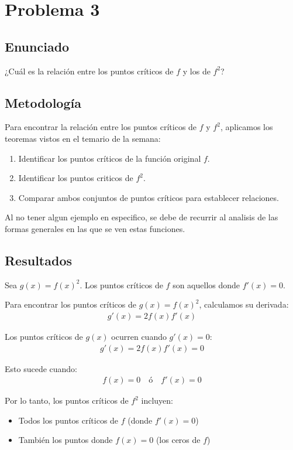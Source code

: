 \documentclass{article}
\begin{document}
\section{Problema 3}

\subsection{Enunciado}
¿Cuál es la relación entre los puntos críticos de $f$ y los de $f^{2}$?

\subsection{Metodología}

Para encontrar la relación entre los puntos críticos de $f$ y $f^2$, aplicamos los teoremas vistos en el temario de la semana:
\begin{enumerate}
    \item Identificar los puntos críticos de la función original $f$.
    \item Identificar los puntos criticos de $f^{2}$.
    \item Comparar ambos conjuntos de puntos críticos para establecer relaciones.
\end{enumerate}

Al no tener algun ejemplo en especifico, se debe de recurrir al analisis de las formas generales en las que se ven estas funciones.

\subsection{Resultados}
\setcounter{equation}{0}
Sea $g(x) = f(x)^2$. Los puntos críticos de $f$ son aquellos donde $f'(x) = 0$.

Para encontrar los puntos críticos de $g(x) = f(x)^2$, calculamos su derivada:
\begin{align}
g'(x) = 2f(x)f'(x)
\end{align}

Los puntos críticos de $g(x)$ ocurren cuando $g'(x) = 0$:
\begin{align}
g'(x) = 2f(x)f'(x) = 0
\end{align}

Esto sucede cuando:
\begin{align}
f(x) = 0 \quad \text{ó} \quad f'(x) = 0
\end{align}

Por lo tanto, los puntos críticos de $f^2$ incluyen:
\begin{itemize}
    \item Todos los puntos críticos de $f$ (donde $f'(x) = 0$)
    \item También los puntos donde $f(x) = 0$ (los ceros de $f$)
\end{itemize}
\end{document}
